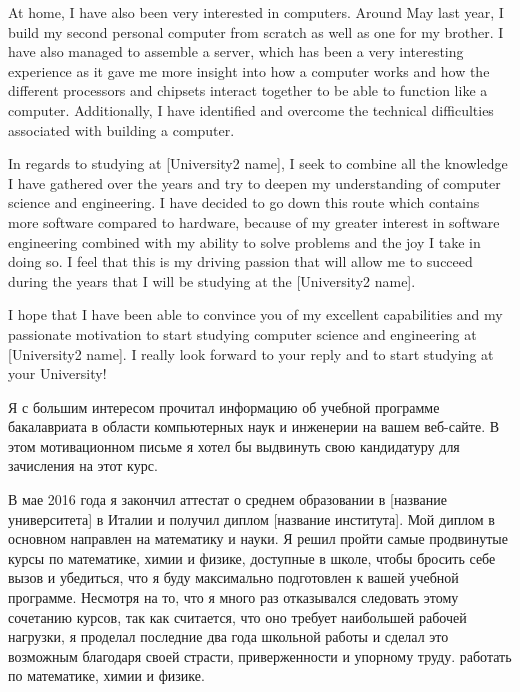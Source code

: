 At home, I have also been very interested in computers. Around May last year, I build my second personal computer from scratch as well as one for my brother. I have also managed to assemble a server, which has been a very interesting experience as it gave me more insight into how a computer works and how the different processors and chipsets interact together to be able to function like a computer. Additionally, I have identified and overcome the technical difficulties associated with building a computer.

In regards to studying at [University2 name], I seek to combine all the knowledge I have gathered over the years and try to deepen my understanding of computer science and engineering. I have decided to go down this route which contains more software compared to hardware, because of my greater interest in software engineering combined with my ability to solve problems and the joy I take in doing so. I feel that this is my driving passion that will allow me to succeed during the years that I will be studying at the [University2 name].

I hope that I have been able to convince you of my excellent capabilities and my passionate motivation to start studying computer science and engineering at [University2 name]. I really look forward to your reply and to start studying at your University!








Я с большим интересом прочитал информацию об учебной программе бакалавриата в области компьютерных наук и инженерии на вашем веб-сайте. В этом мотивационном письме я хотел бы выдвинуть свою кандидатуру для зачисления на этот курс.

В мае 2016 года я закончил аттестат о среднем образовании в [название университета] в Италии и получил диплом [название института]. Мой диплом в основном направлен на математику и науки. Я решил пройти самые продвинутые курсы по математике, химии и физике, доступные в школе, чтобы бросить себе вызов и убедиться, что я буду максимально подготовлен к вашей учебной программе. Несмотря на то, что я много раз отказывался следовать этому сочетанию курсов, так как считается, что оно требует наибольшей рабочей нагрузки, я проделал последние два года школьной работы и сделал это возможным благодаря своей страсти, приверженности и упорному труду. работать по математике, химии и физике.


